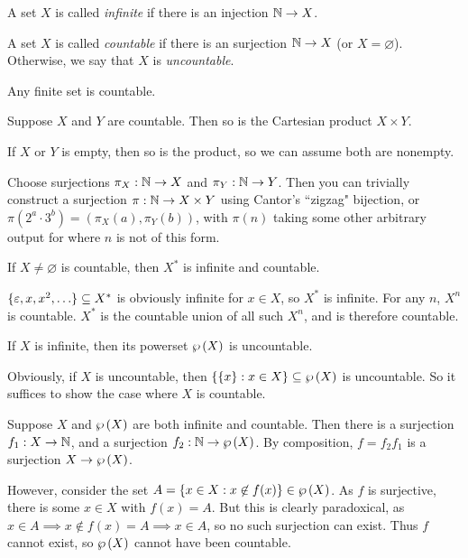 \documentclass{article}
\begin{document}
\begin{definition}
	A set $X$ is called \textit{infinite} if there is an injection $\mathbb{N} \to X$.
		
	A set $X$ is called \textit{countable} if there is an surjection $\mathbb{N} \to X$ (or $X = \varnothing$). Otherwise, we say that $X$ is \textit{uncountable}.
\end{definition}

\begin{corollary}
	Any finite set is countable.
\end{corollary}

\begin{proposition}
	\label{countability-of-products}
	Suppose $X$ and $Y$ are countable. Then so is the Cartesian product $X \times Y$.
\end{proposition}

\begin{prf}
	If $X$ or $Y$ is empty, then so is the product, so we can assume both are nonempty.
		
	Choose surjections $\pi_X: \mathbb{N} \to X$ and $\pi_Y: \mathbb{N} \to Y$. Then you can trivially construct a surjection $\pi : \mathbb{N} \to X \times Y$ using Cantor's ``zigzag" bijection, or $\pi(2^a \cdot 3^b) = (\pi_X(a), \pi_Y(b))$, with $\pi(n)$ taking some other arbitrary output for where $n$ is not of this form.
\end{prf}

\begin{proposition}[Countability of $X^*$]
	\label{countability-of-x-strings}
	If $X \neq \varnothing$ is countable, then $X^*$ is infinite and countable.
\end{proposition}

\begin{prf}
	$\{\varepsilon, x, x^2, \ldots\} \subseteq X^*$ is obviously infinite for $x \in X$, so $X^*$ is infinite. For any $n$, $X^n$ is countable. $X^*$ is the countable union of all such $X^n$, and is therefore countable.
\end{prf}

\begin{theorem}
	\label{cantors-theorem}
	If $X$ is infinite, then its powerset $\wp\left(X\right)$ is uncountable.
\end{theorem}

\begin{prf}
	Obviously, if $X$ is uncountable, then $\{\{x\}: x \in X\} \subseteq \wp\left(X\right)$ is uncountable. So it suffices to show the case where $X$ is countable.
		
	Suppose $X$ and $\wp\left(X\right)$ are both infinite and countable. Then there is a surjection $f_1: X \to \mathbb{N}$, and a surjection $f_2: \mathbb{N} \to \wp\left(X\right)$. By composition, $f = f_2 f_1$ is a surjection $X \to \wp\left(X\right)$.
		
	However, consider the set $A = \{x \in X : x \not\in f(x) \} \in \wp\left(X\right)$. As $f$ is surjective, there is some $x \in X$ with $f(x) = A$. But this is clearly paradoxical, as $x \in A \implies x \not\in f(x) = A \implies x \in A$, so no such surjection can exist. Thus $f$ cannot exist, so $\wp\left(X\right)$ cannot have been countable.
\end{prf}
\end{document}
